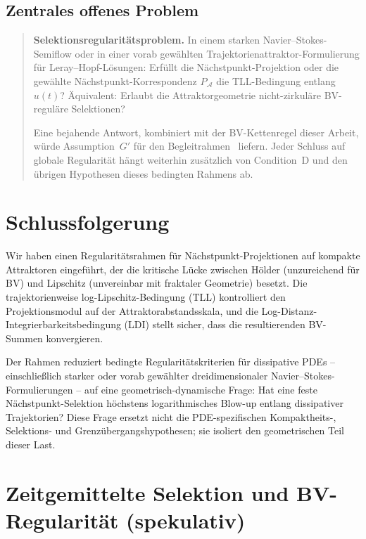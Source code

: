 \documentclass[12pt,a4paper]{article}
\theoremstyle{definition}
\theoremstyle{plain}
\theoremstyle{remark}
\begin{document}
\subsection*{Zentrales offenes Problem}
\begin{quote}
\textbf{Selektionsregularitätsproblem.}
In einem starken Navier--Stokes-Semiflow oder in einer vorab gewählten Trajektorienattraktor-Formulierung für Leray--Hopf-Lösungen: Erfüllt die Nächstpunkt-Projektion oder die gewählte Nächstpunkt-Korrespondenz $P_\mathcal{A}$ die TLL-Bedingung entlang $u(t)$? Äquivalent: Erlaubt die Attraktorgeometrie nicht-zirkuläre BV-reguläre Selektionen?

Eine bejahende Antwort, kombiniert mit der BV-Kettenregel dieser Arbeit, würde Assumption~$G'$ für den Begleitrahmen~\cite{FST-NS2026} liefern. Jeder Schluss auf globale Regularität hängt weiterhin zusätzlich von Condition~D und den übrigen Hypothesen dieses bedingten Rahmens ab.
\end{quote}


\section{Schlussfolgerung}

Wir haben einen Regularitätsrahmen für Nächstpunkt-Projektionen
auf kompakte Attraktoren eingeführt, der die kritische Lücke
zwischen Hölder (unzureichend für BV) und Lipschitz (unvereinbar
mit fraktaler Geometrie) besetzt.  Die trajektorienweise
log-Lipschitz-Bedingung (TLL) kontrolliert den Projektionsmodul auf
der Attraktorabstandsskala, und die
Log-Distanz-Integrierbarkeitsbedingung (LDI) stellt sicher, dass die
resultierenden BV-Summen konvergieren.

Der Rahmen reduziert bedingte Regularitätskriterien für dissipative
PDEs -- einschließlich starker oder vorab gewählter
dreidimensionaler Navier--Stokes-Formulierungen -- auf eine
geometrisch-dynamische Frage: Hat eine feste Nächstpunkt-Selektion
höchstens logarithmisches Blow-up entlang dissipativer Trajektorien?
Diese Frage ersetzt nicht die PDE-spezifischen Kompaktheits-,
Selektions- und Grenzübergangshypothesen; sie isoliert den
geometrischen Teil dieser Last.


\section{Zeitgemittelte Selektion und BV-Regularität (spekulativ)}
\label{sec:time-averaged}
\end{document}
